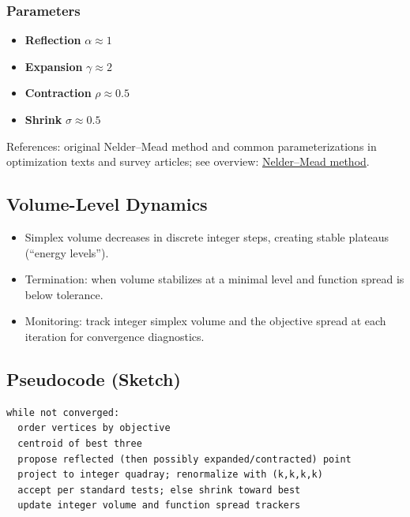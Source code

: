 \documentclass[
  10pt,
]{article}
\providecommand{\tightlist}{%
  \setlength{\itemsep}{0pt}\setlength{\parskip}{0pt}}
\begin{document}
\hypertarget{parameters}{%
\subsubsection{Parameters}\label{parameters}}

\begin{itemize}
\tightlist
\item
  \textbf{Reflection} \(\alpha \approx 1\)
\item
  \textbf{Expansion} \(\gamma \approx 2\)
\item
  \textbf{Contraction} \(\rho \approx 0.5\)
\item
  \textbf{Shrink} \(\sigma \approx 0.5\)
\end{itemize}

References: original Nelder--Mead method and common parameterizations in
optimization texts and survey articles; see overview:
\href{https://en.wikipedia.org/wiki/Nelder\%E2\%80\%93Mead_method}{Nelder--Mead
method}.

\hypertarget{volume-level-dynamics}{%
\subsection{Volume-Level Dynamics}\label{volume-level-dynamics}}

\begin{itemize}
\tightlist
\item
  Simplex volume decreases in discrete integer steps, creating stable
  plateaus (``energy levels'').
\item
  Termination: when volume stabilizes at a minimal level and function
  spread is below tolerance.
\item
  Monitoring: track integer simplex volume and the objective spread at
  each iteration for convergence diagnostics.
\end{itemize}

\hypertarget{pseudocode-sketch}{%
\subsection{Pseudocode (Sketch)}\label{pseudocode-sketch}}

\begin{lstlisting}
while not converged:
  order vertices by objective
  centroid of best three
  propose reflected (then possibly expanded/contracted) point
  project to integer quadray; renormalize with (k,k,k,k)
  accept per standard tests; else shrink toward best
  update integer volume and function spread trackers
\end{lstlisting}
\end{document}
